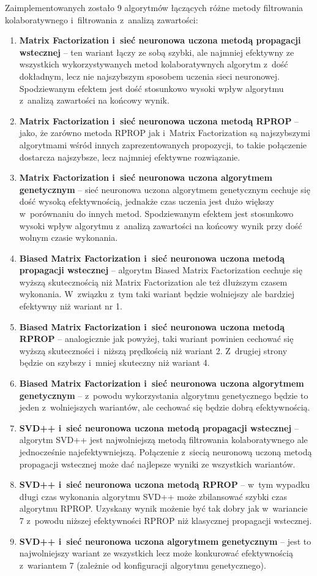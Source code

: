 \documentclass[twoside]{iisthesis}
\begin{document}
		 Zaimplementowanych zostało 9 algorytmów łączących różne metody filtrowania kolaboratywnego i~filtrowania z~analizą zawartości:
		 
		 \begin{enumerate}
		 	\item \textbf{Matrix Factorization i~sieć neuronowa uczona metodą propagacji wstecznej} -- ten wariant łączy ze sobą szybki, ale najmniej efektywny ze wszystkich wykorzystywanych metod kolaboratywnych algorytm z~dość dokładnym, lecz nie najszybszym sposobem uczenia sieci neuronowej. Spodziewanym efektem jest dość stosunkowo wysoki wpływ algorytmu z~analizą zawartości na końcowy wynik. 
		 	\item \textbf{Matrix Factorization i~sieć neuronowa uczona metodą RPROP} -- jako, że zarówno metoda RPROP jak i~Matrix Factorization są najszybszymi algorytmami wśród innych zaprezentowanych propozycji, to takie połączenie dostarcza najszybsze, lecz najmniej efektywne rozwiązanie.
		 	\item \textbf{Matrix Factorization i~sieć neuronowa uczona algorytmem genetycznym} -- sieć neuronowa uczona algorytmem genetycznym cechuje się dość wysoką efektywnością, jednakże czas uczenia jest dużo większy w~porównaniu do innych metod. Spodziewanym efektem jest stosunkowo wysoki wpływ algorytmu z~analizą zawartości na końcowy wynik przy dość wolnym czasie wykonania.
		 	\item \textbf{Biased Matrix Factorization i~sieć neuronowa uczona metodą propagacji wstecznej} -- algorytm Biased Matrix Factorization cechuje się wyższą skutecznością niż Matrix Factorization ale też dłuższym czasem wykonania. W~związku z~tym taki wariant będzie wolniejszy ale bardziej efektywny niż wariant nr 1.
		 	\item \textbf{Biased Matrix Factorization i~sieć neuronowa uczona metodą RPROP} -- analogicznie jak powyżej, taki wariant powinien cechować się wyższą skuteczności i~niższą prędkością niż wariant 2. Z~drugiej strony będzie on szybszy i~mniej skuteczny niż wariant 4.
		 	\item \textbf{Biased Matrix Factorization i~sieć neuronowa uczona algorytmem genetycznym} -- z~powodu wykorzystania algorytmu genetycznego będzie to jeden z~wolniejszych wariantów, ale cechować się będzie dobrą efektywnością.	 	
		 	\item \textbf{SVD++ i~sieć neuronowa uczona metodą propagacji wstecznej} -- algorytm SVD++ jest najwolniejszą metodą filtrowania kolaboratywnego ale jednocześnie najefektywniejszą. Połączenie z~siecią neuronową uczoną metodą propagacji wstecznej może dać najlepsze wyniki ze wszystkich wariantów.
		 	\item \textbf{SVD++ i~sieć neuronowa uczona metodą RPROP} -- w~tym wypadku długi czas wykonania algorytmu SVD++ może zbilansować szybki czas algorytmu RPROP. Uzyskany wynik możenie być tak dobry jak w~wariancie 7 z~powodu niższej efektywności RPROP niż klasycznej propagacji wstecznej.
		 	\item \textbf{SVD++ i~sieć neuronowa uczona algorytmem genetycznym} -- jest to najwolniejszy wariant ze wszystkich lecz może konkurować efektywnością z~wariantem 7 (zależnie od konfiguracji algorytmu genetycznego).
		 \end{enumerate}
	 
\end{document}
